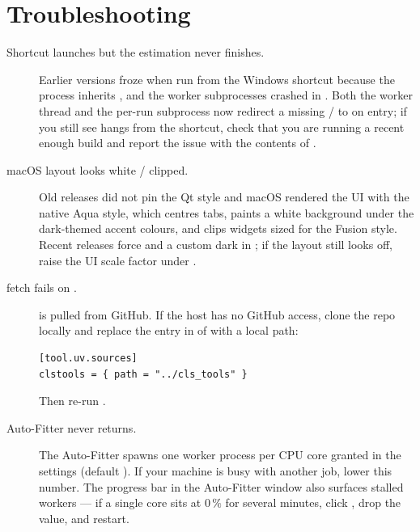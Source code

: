 \section{Troubleshooting}
\label{sec:troubleshooting}

\begin{description}
    \item[Shortcut launches but the estimation never finishes.]
        Earlier versions froze when run from the Windows shortcut
        because the  process inherits
        , and the worker subprocesses crashed
        in . Both the worker thread and the per-run
        subprocess now redirect a missing /
        to  on entry; if you still see hangs from
        the shortcut, check that you are running a recent enough
        build and report the issue with the contents of
        .
    \item[macOS layout looks white / clipped.]
        Old releases did not pin the Qt style and macOS rendered the
        UI with the native Aqua style, which centres tabs, paints a
        white background under the dark-themed accent colours, and
        clips widgets sized for the Fusion style. Recent releases
        force  and a custom dark
         in ; if the layout
        still looks off, raise the UI scale factor under
        .
    \item[ fetch fails on .]
         is pulled from GitHub. If the host has no
        GitHub access, clone the repo locally and replace the entry
        in  of  with a
        local path:
\begin{lstlisting}
[tool.uv.sources]
clstools = { path = "../cls_tools" }
\end{lstlisting}
        Then re-run .
    \item[Auto-Fitter never returns.]
        The Auto-Fitter spawns one worker process per CPU core
        granted in the  settings (default
        ). If your machine is busy with another
        job, lower this number. The progress bar in the Auto-Fitter
        window also surfaces stalled workers --- if a single core
        sits at $0\,\%$ for several minutes, click , drop
        the  value, and restart.

\end{description}
